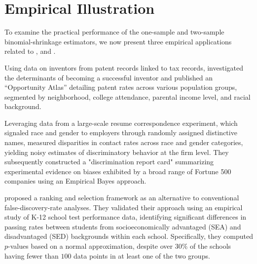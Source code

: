 \documentclass[12pt,letterpaper]{article}
\begin{document}
\section{Empirical Illustration}\label{sec:empirical}
To examine the practical performance of the one-sample and two-sample binomial-shrinkage estimators, we now present three empirical applications related to \citet{bell2019becomes}, \citet{kline2024discrimination} and \citet{gang2023ranking}. 

Using data on inventors from patent records linked to tax records, \citet{bell2019becomes} investigated the determinants of becoming a successful inventor and published an ``Opportunity Atlas'' detailing patent rates across various population groups, segmented by neighborhood, college attendance, parental income level, and racial background. 

Leveraging data from a large-scale resume correspondence experiment, which signaled race and gender to employers through randomly assigned distinctive names, \citet{kline2024discrimination} measured disparities in contact rates across race and gender categories, yielding noisy estimates of discriminatory behavior at the firm level. They subsequently constructed a "discrimination report card" summarizing experimental evidence on biases exhibited by a broad range of Fortune 500 companies using an Empirical Bayes approach. 

\citet{gang2023ranking} proposed a ranking and selection framework as an alternative to conventional false-discovery-rate analyses. They validated their approach using an empirical study of K-12 school test performance data, identifying significant differences in passing rates between students from socioeconomically advantaged (SEA) and disadvantaged (SED) backgrounds within each school. Specifically, they computed $p$-values based on a normal approximation, despite over $30\%$ of the schools having fewer than $100$ data points in at least one of the two groups.
\end{document}
